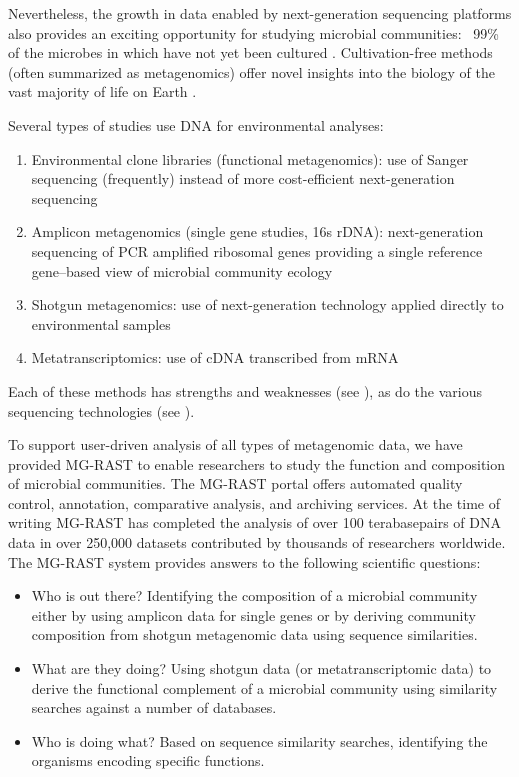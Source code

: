 \documentclass[12pt,fullpage]{report}
\begin{document}
Nevertheless, the growth in data enabled by next-generation sequencing platforms also provides an exciting opportunity for studying microbial communities: ~99\% of the microbes in which have not yet been cultured \cite{MGREVIEW}. Cultivation-free methods (often summarized as metagenomics) offer novel insights into the biology of the vast majority of life on Earth \cite{THOMASREVIEW}.

Several  types of studies use DNA for environmental analyses:

\begin{enumerate}

\item Environmental clone libraries (functional metagenomics):
use of Sanger sequencing (frequently) instead of more cost-efficient next-generation sequencing

\item Amplicon metagenomics (single gene studies, \gls{16s} rDNA):
next-generation sequencing of PCR amplified ribosomal genes providing a single reference gene--based view of microbial community ecology

\item Shotgun metagenomics:
use of next-generation technology applied directly to environmental samples

\item Metatranscriptomics:
use of cDNA transcribed from mRNA

\end{enumerate}

\noindent
Each of these methods has strengths and weaknesses (see \cite{THOMASREVIEW}), as do the various sequencing technologies (see \cite{LOMAN}).

To support user-driven analysis of all types of metagenomic data, we have provided MG-RAST \cite{MG-RAST} to enable researchers to study the function and composition of microbial communities.
The MG-RAST portal offers automated quality control, annotation, comparative analysis, and archiving services.
At the time of writing MG-RAST has completed the analysis of over 100 terabasepairs of DNA data in over 250,000 datasets contributed by thousands of researchers worldwide.\\



The MG-RAST system provides answers to the following scientific questions:
\begin{itemize}
\item Who is out there?
Identifying the composition of a microbial community either by using amplicon data for single genes or by deriving community composition from shotgun metagenomic data using sequence similarities.

\item What are they doing?
Using shotgun data (or metatranscriptomic data) to derive the functional complement of a microbial community using similarity searches against a number of databases.

\item Who is doing what?
Based on sequence similarity searches, identifying the organisms encoding specific functions.
\end{itemize}
\end{document}
